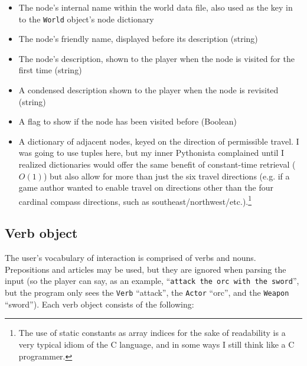 \documentclass[11pt,letterpaper]{article}
\begin{document}
\begin{itemize}
    \item The node's internal name within the world data file, also used as the key in to the {\tt World} object's node dictionary
    \item The node's friendly name, displayed before its description (string)
    \item The node's description, shown to the player when the node is visited for the first time (string)
    \item A condensed description shown to the player when the node is revisited (string)
    \item A flag to show if the node has been visited before (Boolean)
    \item A dictionary of adjacent nodes, keyed on the direction of permissible travel.  I was going to use tuples here, but my inner Pythonista complained until I realized dictionaries would offer the same benefit of constant-time retrieval ($O(1)$) but also allow for more than just the six travel directions (e.g. if a game author wanted to enable travel on directions other than the four cardinal compass directions, such as southeast/northwest/etc.).\footnote{The use of static constants as array indices for the sake of readability is a very typical idiom of the C language, and in some ways I still think like a C programmer.}
\end{itemize}

\subsection{Verb object}

The user's vocabulary of interaction is comprised of verbs and nouns.  Prepositions and articles may be used, but they are ignored when parsing the input (so the player can say, as an example, ``{\tt attack the orc with the sword}'', but the program only sees the {\tt Verb} ``attack'', the {\tt Actor} ``orc'', and the {\tt Weapon} ``sword'').  Each verb object consists of the following:
\end{document}
